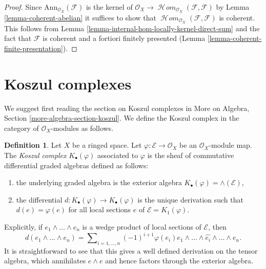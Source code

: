 \documentclass{stacks-project}
\theoremstyle{plain}
\theoremstyle{definition}
\newtheorem{definition}[subsection]{Definition}
\theoremstyle{remark}
\numberwithin{equation}{subsection}
\def\SheafHom{\mathop{\mathcal{H}\!\mathit{om}}\nolimits}
\begin{document}
\begin{proof}
Since $\text{Ann}_{\mathcal{O}_X}(\mathcal{F})$ is the kernel of
$\mathcal{O}_X \to \SheafHom_{\mathcal{O}_X}(\mathcal{F}, \mathcal{F})$
by Lemma \ref{lemma-coherent-abelian} it suffices
to show that $\SheafHom_{\mathcal{O}_X}(\mathcal{F}, \mathcal{F})$ is
coherent. This follows from 
Lemma \ref{lemma-internal-hom-locally-kernel-direct-sum}
and the fact that $\mathcal{F}$ is coherent and a fortiori finitely presented
(Lemma \ref{lemma-coherent-finite-presentation}).
\end{proof}





\section{Koszul complexes}
\label{section-koszul-complex}

\noindent
We suggest first reading the section on Koszul complexes in
More on Algebra, Section \ref{more-algebra-section-koszul}.
We define the Koszul complex in the category of $\mathcal{O}_X$-modules
as follows.

\begin{definition}
\label{definition-koszul}
Let $X$ be a ringed space. Let $\varphi : \mathcal{E} \to \mathcal{O}_X$
be an $\mathcal{O}_X$-module map. The
{\it Koszul complex} $K_\bullet(\varphi)$ associated to $\varphi$
is the sheaf of commutative differential graded algebras defined as follows:
\begin{enumerate}
\item the underlying graded algebra is the exterior algebra
$K_\bullet(\varphi) = \wedge(\mathcal{E})$,
\item the differential $d : K_\bullet(\varphi) \to K_\bullet(\varphi)$
is the unique derivation such that $d(e) = \varphi(e)$ for all
local sections $e$ of $\mathcal{E} = K_1(\varphi)$.
\end{enumerate}
\end{definition}

\noindent
Explicitly, if $e_1 \wedge \ldots \wedge e_n$ is a wedge product of local
sections of $\mathcal{E}$, then
$$
d(e_1 \wedge \ldots \wedge e_n) =
\sum\nolimits_{i = 1, \ldots, n} (-1)^{i + 1}
\varphi(e_i)e_1 \wedge \ldots \wedge \widehat{e_i} \wedge \ldots \wedge e_n.
$$
It is straightforward to see that this gives a well defined derivation
on the tensor algebra, which annihilates $e \wedge e$ and hence factors
through the exterior algebra.
\end{document}
